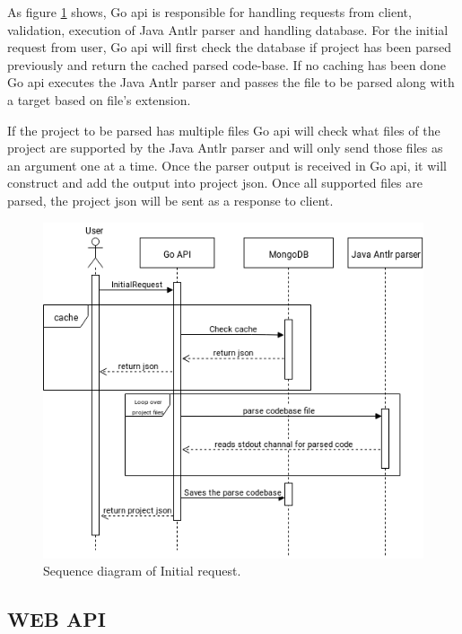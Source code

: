 As figure \ref{fig:sequenceInitial} shows, Go \gls{api} is responsible for handling requests from \gls{client}, validation, execution of Java \gls{Antlr} parser and handling database. For the initial request from user, Go \gls{api} will first check the database if project has been parsed previously and return the cached parsed code-base. If no caching has been done Go \gls{api} executes the Java \gls{Antlr} parser and passes the file to be parsed along with a target based on file's extension.

If the project to be parsed has multiple files Go \gls{api} will check what files of the project are supported by the Java \gls{Antlr} parser and will only send those files as an argument one at a time. Once the parser output is received in Go \gls{api}, it will construct and add the output  into project \gls{json}. Once all supported files are parsed, the project \gls{json} will be sent as a response to \gls{client}.

\begin{figure}[H] 
    \includegraphics[width=\textwidth]{inc/images/InitialRequestSequenceDiagram.png}
    \caption{Sequence diagram of Initial request.}
    \label{fig:sequenceInitial}
\end{figure}

\subsection{WEB API}


